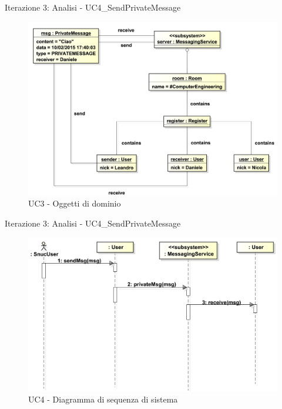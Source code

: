 \begin{frame} {Iterazione 3: Analisi - UC4\_SendPrivateMessage}
   \begin{figure}
     \includegraphics[scale=0.22]{image_astah/Iteration_3_DomainModel/UC4_SendPrivateMessage_OM.png}{\centering}
     \caption{UC3 - Oggetti di dominio}
     \label{fig_UC4_SPM_OM} 
   \end{figure}
\end{frame}

\begin{frame} {Iterazione 3: Analisi - UC4\_SendPrivateMessage}
   \begin{figure}
     \includegraphics[scale=0.28]{image_astah/Iteration_3_DomainModel/UC4_SendPrivateMessage_SSD.png}{\centering}
     \caption{UC4 - Diagramma di sequenza di sistema}
     \label{fig_UC4_SPM_SSD} 
   \end{figure}
\end{frame}

